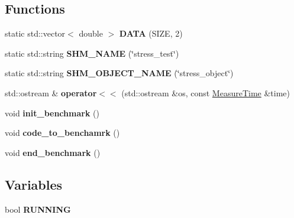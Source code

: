\subsection*{Functions}
\begin{DoxyCompactItemize}
\item 
\mbox{\label{benchmark__common_8hh_a59c33a6b3ce646e26614a12d0193a2bd}} 
static std\+::vector$<$ double $>$ {\bfseries D\+A\+TA} (S\+I\+ZE, 2)
\item 
\mbox{\label{benchmark__common_8hh_a2eab504a26ce27f25dc75a77486f0291}} 
static std\+::string {\bfseries S\+H\+M\+\_\+\+N\+A\+ME} (\char`\"{}stress\+\_\+test\char`\"{})
\item 
\mbox{\label{benchmark__common_8hh_a7b0c439ad35b06a4ef0180f55a6d005a}} 
static std\+::string {\bfseries S\+H\+M\+\_\+\+O\+B\+J\+E\+C\+T\+\_\+\+N\+A\+ME} (\char`\"{}stress\+\_\+object\char`\"{})
\item 
\mbox{\label{benchmark__common_8hh_a8dd0271b9a992c4b761972f7082052a0}} 
std\+::ostream \& {\bfseries operator$<$$<$} (std\+::ostream \&os, const \hyperlink{structMeasureTime}{Measure\+Time} \&time)
\item 
\mbox{\label{benchmark__common_8hh_aa10d0d36e9613185c60cd04e376e12bc}} 
void {\bfseries init\+\_\+benchmark} ()
\item 
\mbox{\label{benchmark__common_8hh_a91d65608f8757f45d8db7c6e58dfe9f4}} 
void {\bfseries code\+\_\+to\+\_\+benchamrk} ()
\item 
\mbox{\label{benchmark__common_8hh_a3ae3ecd5464dfa055c802feb243e62d9}} 
void {\bfseries end\+\_\+benchmark} ()
\end{DoxyCompactItemize}
\subsection*{Variables}
\begin{DoxyCompactItemize}
\item 
\mbox{\label{benchmark__common_8hh_a383e703fc3e9dd425f075cf463ee4c5b}} 
bool {\bfseries R\+U\+N\+N\+I\+NG}
\end{DoxyCompactItemize}


